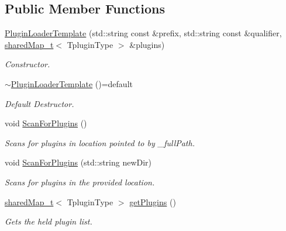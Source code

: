 \subsection*{Public Member Functions}
\begin{DoxyCompactItemize}
\item 
\mbox{\hyperlink{classPluginLoader_1_1PluginLoaderTemplate_a6de1c3f2ff295225c6f10d891ffa0048}{Plugin\+Loader\+Template}} (std\+::string const \&prefix, std\+::string const \&qualifier, \mbox{\hyperlink{namespacePluginLoader_a8e505caea20d9f45155939545d29f6ba}{shared\+Map\+\_\+t}}$<$ Tplugin\+Type $>$ \&plugins)
\begin{DoxyCompactList}\small\item\em Constructor. \end{DoxyCompactList}\item 
\mbox{\label{classPluginLoader_1_1PluginLoaderTemplate_a3663519d9a9b078d90970f04e9aa30a7}} 
\mbox{\hyperlink{classPluginLoader_1_1PluginLoaderTemplate_a3663519d9a9b078d90970f04e9aa30a7}{$\sim$\+Plugin\+Loader\+Template}} ()=default
\begin{DoxyCompactList}\small\item\em Default Destructor. \end{DoxyCompactList}\item 
\mbox{\label{classPluginLoader_1_1PluginLoaderTemplate_a19b981eaca766d73614927c428cb6846}} 
void \mbox{\hyperlink{classPluginLoader_1_1PluginLoaderTemplate_a19b981eaca766d73614927c428cb6846}{Scan\+For\+Plugins}} ()
\begin{DoxyCompactList}\small\item\em Scans for plugins in location pointed to by \+\_\+full\+Path. \end{DoxyCompactList}\item 
void \mbox{\hyperlink{classPluginLoader_1_1PluginLoaderTemplate_a8d969fc7c5f2848afef9a3a8255876ec}{Scan\+For\+Plugins}} (std\+::string new\+Dir)
\begin{DoxyCompactList}\small\item\em Scans for plugins in the provided location. \end{DoxyCompactList}\item 
\mbox{\hyperlink{namespacePluginLoader_a8e505caea20d9f45155939545d29f6ba}{shared\+Map\+\_\+t}}$<$ Tplugin\+Type $>$ \mbox{\hyperlink{classPluginLoader_1_1PluginLoaderTemplate_ae04498d46d4e9e1824eee156d8bef9d7}{get\+Plugins}} ()
\begin{DoxyCompactList}\small\item\em Gets the held plugin list. \end{DoxyCompactList}\end{DoxyCompactItemize}


